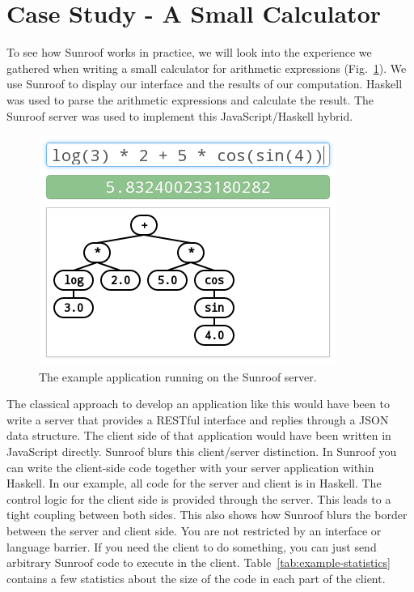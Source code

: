 \documentclass{llncs}
\newcommand{\FigRef}[1]{Fig.~\ref{#1}}
\newcommand{\TabRef}[1]{Table~\ref{#1}}
\begin{document}
\section{Case Study - A Small Calculator}
\label{sec:extended-example}

To see how Sunroof works in practice, we will look into the 
experience we gathered when writing a small calculator
for arithmetic expressions (\FigRef{fig:example-application}). 
We use Sunroof to display our interface
and the results of our computation. Haskell was used to parse the 
arithmetic expressions and calculate the result. The Sunroof server 
was used to implement this JavaScript/Haskell hybrid.

\begin{figure}[t]%
\begin{center}%
\includegraphics[scale=0.5]{figures/example-application.png}%
\end{center}%
\caption{The example application running on the Sunroof server.}%
\label{fig:example-application}
\end{figure}


The classical approach to develop an application like this would have 
been to write a server that provides a RESTful interface and replies 
through a JSON data structure. 
The client side of that application would have been written in JavaScript
directly.
Sunroof blurs this client/server distinction.
In Sunroof you can write the client-side code together with
your server application within Haskell. In our example, all code 
for the server and client is in Haskell. The control logic 
for the client side is provided through the server.
This leads to a tight coupling between both sides. 
This also shows how Sunroof blurs the border between the server 
and client side. You are not restricted by an interface or language 
barrier. If you need the client to do something, you can just 
send arbitrary Sunroof code to execute in the client.
%
\TabRef{tab:example-statistics} contains a few statistics 
about the size of the code in each part of the client.
\end{document}
